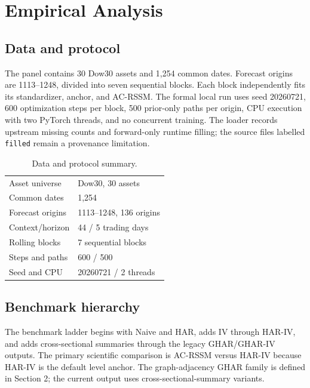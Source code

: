 \documentclass[11pt]{article}
\begin{document}
\section{Empirical Analysis}
\subsection{Data and protocol}
The panel contains 30 Dow30 assets and 1,254 common dates. Forecast origins are 1113--1248, divided into seven sequential blocks. Each block independently fits its standardizer, anchor, and AC-RSSM. The formal local run uses seed 20260721, 600 optimization steps per block, 500 prior-only paths per origin, CPU execution with two PyTorch threads, and no concurrent training. The loader records upstream missing counts and forward-only runtime filling; the source files labelled \texttt{filled} remain a provenance limitation.

\begin{table}[h]\centering\caption{Data and protocol summary.}\begin{tabular}{ll}\toprule Asset universe & Dow30, 30 assets\\ Common dates & 1,254\\ Forecast origins & 1113--1248, 136 origins\\ Context/horizon & 44 / 5 trading days\\ Rolling blocks & 7 sequential blocks\\ Steps and paths & 600 / 500\\ Seed and CPU & 20260721 / 2 threads\\\bottomrule\end{tabular}\end{table}

\subsection{Benchmark hierarchy}
The benchmark ladder begins with Naive and HAR, adds IV through HAR-IV, and adds cross-sectional summaries through the legacy GHAR/GHAR-IV outputs. The primary scientific comparison is AC-RSSM versus HAR-IV because HAR-IV is the default level anchor. The graph-adjacency GHAR family is defined in Section 2; the current output uses cross-sectional-summary variants.
\end{document}
